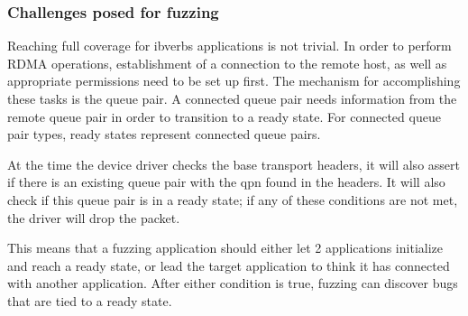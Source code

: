 \subsubsection{Challenges posed for fuzzing}\label{s:ibverbs-challenges}

Reaching full coverage for ibverbs applications is not trivial. In order to perform RDMA operations, establishment of
a connection to the remote host, as well as appropriate permissions need to be set up first. The mechanism for accomplishing
these tasks is the queue pair\cite{rdmamanual}. A connected queue pair
needs information from the remote queue pair in order to transition to a ready state.
For connected queue pair types, ready states represent connected queue pairs.

At the time the device driver checks the base transport headers, it will also assert if there is an existing queue pair
with the qpn found in the headers. It will also check if this queue pair is in a ready state; if any of these conditions
are not met, the driver will drop the packet.

This means that a fuzzing application should either let 2 applications initialize and reach a ready state,
or lead the target application to think it has connected with another application. After either condition is true,
fuzzing can discover bugs that are tied to a ready state.










